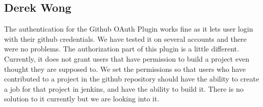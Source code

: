 \documentclass[10pt,onecolumn,journal,draftclsnofoot]{IEEEtran}
\begin{document}
\subsection{Derek Wong}
The authentication for the Github OAuth Plugin works fine as it lets user login with their github credentials. We have tested it on several accounts and there were no problems. The authorization part of this plugin is a little different. Currently, it does not grant users that have permission to build a project even thought they are supposed to. We set the permissions so that users who have contributed to a project in the github repository should have the ability to create a job for that project in jenkins, and have the ability to build it. There is no solution to it currently but we are looking into it.
\end{document}
